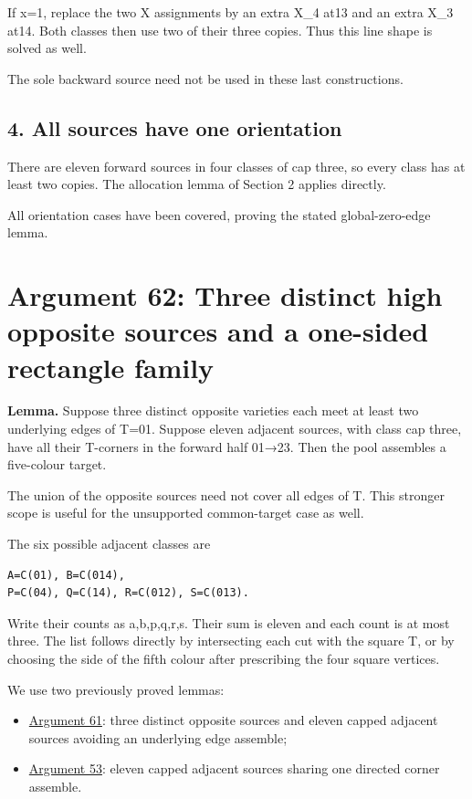 \documentclass[
  10pt,
]{article}
\providecommand{\tightlist}{%
  \setlength{\itemsep}{0pt}\setlength{\parskip}{0pt}}
\begin{document}
If x=1, replace the two X assignments by an extra X\_4 at13 and an extra
X\_3 at14. Both classes then use two of their three copies. Thus this
line shape is solved as well.

The sole backward source need not be used in these last constructions.

\hypertarget{all-sources-have-one-orientation}{%
\subsection*{4. All sources have one
orientation}\label{all-sources-have-one-orientation}}

There are eleven forward sources in four classes of cap three, so every
class has at least two copies. The allocation lemma of Section 2 applies
directly.

All orientation cases have been covered, proving the stated
global-zero-edge lemma.

\hypertarget{arg-62}{%
\section{Argument 62: Three distinct high opposite sources and a
one-sided rectangle family}\label{arg-62}}

\textbf{Lemma.} Suppose three distinct opposite varieties each meet at
least two underlying edges of T=01. Suppose eleven adjacent
sources, with class cap three, have all their T-corners in the forward
half 01→23. Then the pool assembles a five-colour target.

The union of the opposite sources need not cover all edges of T. This
stronger scope is useful for the unsupported common-target case as well.

The six possible adjacent classes are

\begin{verbatim}
A=C(01), B=C(014),
P=C(04), Q=C(14), R=C(012), S=C(013).
\end{verbatim}

Write their counts as a,b,p,q,r,s. Their sum is eleven and each count is
at most three. The list follows directly by intersecting each cut with
the square T, or by choosing the side of the fifth colour after
prescribing the four square vertices.

We use two previously proved lemmas:

\begin{itemize}
\tightlist
\item
  \protect\hyperlink{arg-61}{Argument 61}: three distinct opposite
  sources and eleven capped adjacent sources avoiding an underlying edge
  assemble;
\item
  \protect\hyperlink{arg-53}{Argument 53}: eleven capped adjacent
  sources sharing one directed corner assemble.
\end{itemize}
\end{document}
